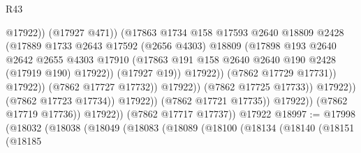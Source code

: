 \begin{lexlean}{R43}
\begin{coremodule}
                                                  @17922))
                                              (@17927 @471))
                                            (@17863
                                              @1734
                                              @158
                                              @17593
                                              @2640
                                              @18809
                                              @2428
                                              (@17889
                                                @1733
                                                @2643
                                                @17592
                                                (@2656 @4303)
                                                @18809
                                                (@17898
                                                  @193
                                                  @2640
                                                  @2642
                                                  @2655
                                                  @4303
                                                  @17910
                                                  (@17863
                                                    @191
                                                    @158
                                                    @2640
                                                    @2640
                                                    @190
                                                    @2428
                                                    (@17919 @190)
                                                    @17922))
                                                (@17927 @19))
                                              @17922))
                                          (@7862 @17729 @17731))
                                        @17922))
                                    (@7862 @17727 @17732))
                                  @17922))
                              (@7862 @17725 @17733))
                            @17922))
                        (@7862 @17723 @17734))
                      @17922))
                  (@7862 @17721 @17735))
                @17922))
            (@7862 @17719 @17736))
          @17922))
      (@7862 @17717 @17737))
    @17922
@18997 := @17998
    (@18032
      (@18038
        (@18049
          (@18083
            (@18089
              (@18100
                (@18134
                  (@18140
                    (@18151
                      (@18185

\end{coremodule}
\end{lexlean}
